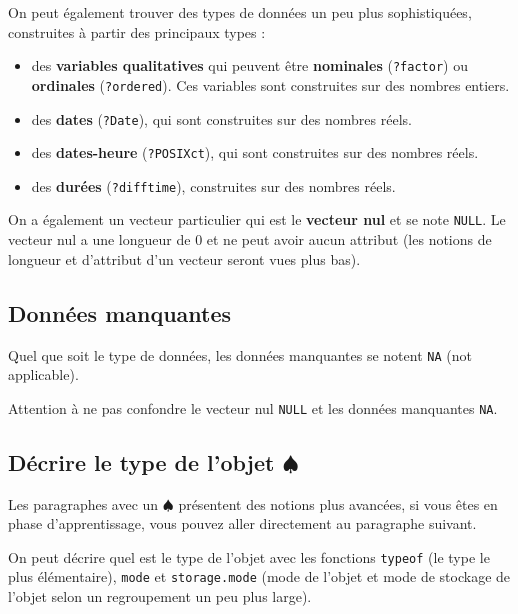 \documentclass[
]{book}
\providecommand{\tightlist}{%
  \setlength{\itemsep}{0pt}\setlength{\parskip}{0pt}}
\begin{document}
On peut également trouver des types de données un peu plus sophistiquées, construites à partir des principaux types :

\begin{itemize}
\tightlist
\item
  des \textbf{variables qualitatives} qui peuvent être \textbf{nominales} (\texttt{?factor}) ou \textbf{ordinales} (\texttt{?ordered}). Ces variables sont construites sur des nombres entiers.
\item
  des \textbf{dates} (\texttt{?Date}), qui sont construites sur des nombres réels.
\item
  des \textbf{dates-heure} (\texttt{?POSIXct}), qui sont construites sur des nombres réels.
\item
  des \textbf{durées} (\texttt{?difftime}), construites sur des nombres réels.
\end{itemize}

On a également un vecteur particulier qui est le \textbf{vecteur nul} et se note \texttt{NULL}. Le vecteur nul a une longueur de 0 et ne peut avoir aucun attribut (les notions de longueur et d'attribut d'un vecteur seront vues plus bas).

\subsection{Données manquantes}\label{donnuxe9es-manquantes}

Quel que soit le type de données, les données manquantes se notent \texttt{NA} (not applicable).

Attention à ne pas confondre le vecteur nul \texttt{NULL} et les données manquantes \texttt{NA}.

\subsection{\texorpdfstring{Décrire le type de l'objet \(\spadesuit\)}{Décrire le type de l'objet \textbackslash spadesuit}}\label{duxe9crire-le-type-de-lobjet-spadesuit}

Les paragraphes avec un \(\spadesuit\) présentent des notions plus avancées, si vous êtes en phase d'apprentissage, vous pouvez aller directement au paragraphe suivant.

On peut décrire quel est le type de l'objet avec les fonctions \texttt{typeof} (le type le plus élémentaire), \texttt{mode} et \texttt{storage.mode} (mode de l'objet et mode de stockage de l'objet selon un regroupement un peu plus large).
\end{document}
